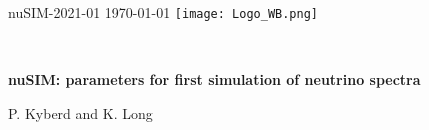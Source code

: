 \graphicspath{ {00-Top-matter/Figures/} }
\thispagestyle{empty}

\noindent nuSIM-2021-01 \hfill \today{} \hfill  \texttt{[image: Logo\_WB.png]}

\vspace{-0.25cm}
\noindent{\color{DarkYellow} \rule[0mm]{\textwidth}{0.43pt}}\\
\vspace{-0.50cm}
\begin{center}
  {\bf\LARGE\color{DarkBlue}
    nuSIM: parameters for first simulation of neutrino spectra
  }
\end{center}
\vspace{-0.4cm}
\begin{center}
  P. Kyberd and K. Long
\end{center}
\vspace{-0.2cm}
